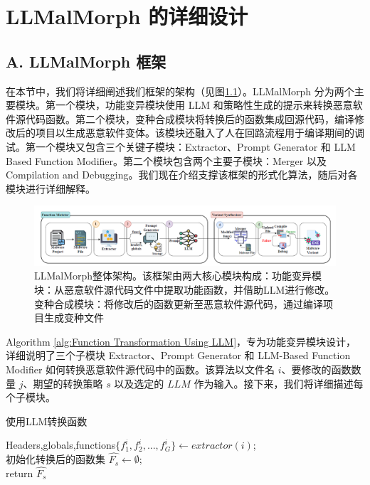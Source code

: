 \chapter{LLMalMorph 的详细设计}

\section{A. LLMalMorph 框架}

在本节中，我们将详细阐述我们框架的架构（见图\ref{fig:4.1}）。LLMalMorph 分为两个主要模块。第一个模块，功能变异模块使用 LLM 和策略性生成的提示来转换恶意软件源代码函数。第二个模块，变种合成模块将转换后的函数集成回源代码，编译修改后的项目以生成恶意软件变体。该模块还融入了人在回路流程用于编译期间的调试。第一个模块又包含三个关键子模块：Extractor、Prompt Generator 和 LLM Based Function Modifier。第二个模块包含两个主要子模块：Merger 以及 Compilation and Debugging。我们现在介绍支撑该框架的形式化算法，随后对各模块进行详细解释。

\begin{figure}[htb]
	\centering
	\includegraphics[width=1.15\textwidth]{figures/figure1.png}
	\caption{LLMalMorph整体架构。该框架由两大核心模块构成：功能变异模块：从恶意软件源代码文件中提取功能函数，并借助LLM进行修改。变种合成模块：将修改后的函数更新至恶意软件源代码，通过编译项目生成变种文件}\label{fig:4.1}
\end{figure}

Algorithm \ref{alg:Function Transformation Using LLM}，专为功能变异模块设计，详细说明了三个子模块 Extractor、Prompt Generator 和 LLM-Based Function Modifier 如何转换恶意软件源代码中的函数。该算法以文件名 $i$、要修改的函数数量 $j$、期望的转换策略 $s$ 以及选定的 $LLM$ 作为输入。接下来，我们将详细描述每个子模块。

\begin{algorithm}[htbp]
	\caption{使用LLM转换函数\label{alg:Function Transformation Using LLM}}

    Headers,globals,functions$\{f_{1}^{i},f_{2}^{i},...,f_{G}^{i}\}\leftarrow extractor(i)$;\\
    初始化转换后的函数集 $\hat{F_{s}}\leftarrow \emptyset$;\\

    return $\hat{F_{s}}$
\end{algorithm}

